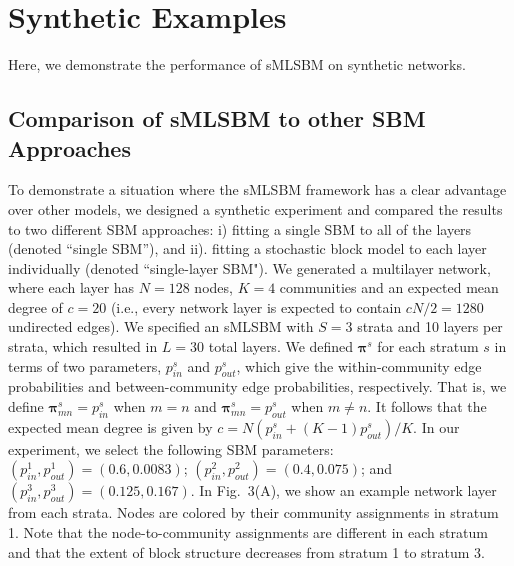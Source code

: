 {\section{Synthetic Examples}
Here, we demonstrate the performance of sMLSBM on synthetic networks.
\subsection{Comparison of sMLSBM to other SBM Approaches}\label{sec:SBM1}
To demonstrate a situation where the sMLSBM framework has a clear advantage over other models, we designed a synthetic experiment and compared the results to two different SBM approaches: i) fitting a single SBM to all of the layers (denoted ``single SBM''), and ii). fitting a stochastic block model to each layer individually (denoted ``single-layer SBM"). We generated a multilayer network, where each layer has $N=128$ nodes, $K=4$ communities and an expected mean degree of $c=20$ (i.e., every network layer is expected to contain $cN/2=1280$ undirected edges). We specified an sMLSBM with $S=3$ strata and 10 layers per strata, which resulted in $L=30$ total layers. We defined ${\boldsymbol \pi}^{s}$ for each stratum $s$ in terms of two parameters, $p_{in}^s$ and $p_{out}^s$, which give the within-community edge probabilities and between-community edge probabilities, respectively. That is, we define ${\boldsymbol \pi}^s_{mn}=p_{in}^s$ when $m=n$ and ${\boldsymbol \pi}^s_{mn}=p_{out}^s$ when $m\not=n$. It follows that the expected mean degree is given by $c=N(p_{in}^s + (K-1)p_{out}^s)/K$.
In our experiment, we select the following SBM parameters: $(p_{in}^1,p_{out}^1)=(0.6,0.0083)$; $(p_{in}^2,p_{out}^2)=(0.4,0.075)$; and $(p_{in}^3,p_{out}^3)=(0.125,0.167)$. 
In Fig.~3(A), we show an example network layer from each strata. Nodes are colored by their community assignments in stratum 1. Note that the node-to-community assignments are different in each stratum and that the extent of block structure decreases from stratum 1 to stratum 3.


}
